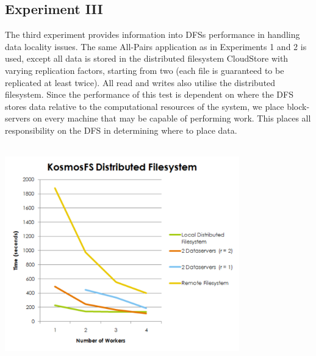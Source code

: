 \documentclass[a4paper,11pt]{article} \pagestyle{empty} \usepackage{amssymb}
\begin{document}
\subsection{Experiment III}
The third experiment provides information into DFSs performance in handling
data locality issues. The same All-Pairs application as in Experiments 1 and 2
is used, except all data is stored in the distributed filesystem CloudStore
with varying replication factors, starting from two (each file is guaranteed to
be replicated at least twice). All read and writes also utilise the distributed
filesystem.  Since the performance of this test is dependent on where the DFS
stores data relative to the computational resources of the system, we place
block-servers on every machine that may be capable of performing work.  This
places all responsibility on the DFS in determining where to place data.
\includegraphics[width=4in,height=4in]{KFSTest.pdf}
\end{document}
